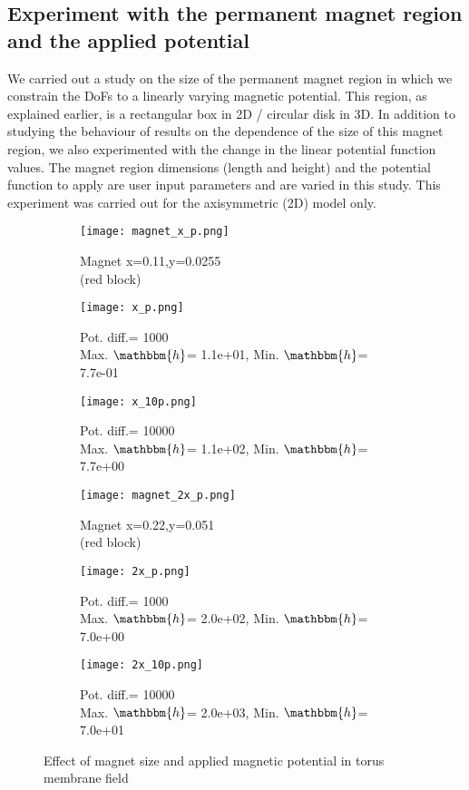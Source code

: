 \subsection{Experiment with the permanent magnet region and the applied potential}
We carried out a study on the size of the permanent magnet region in which we constrain the DoFs to a linearly varying magnetic potential. This region, as explained earlier, is a rectangular box in 2D / circular disk in 3D. In addition to studying the behaviour of results on the dependence of the size of this magnet region, we also experimented with the change in the linear potential function values. The magnet region dimensions (length and height) and the potential function to apply are user input parameters and are varied in this study. This experiment was carried out for the axisymmetric (2D) model only.\par 

\begin{figure}[h]
\centering
\begin{subfigure}{0.32\textwidth}
\centering
\texttt{[image: magnet\_x\_p.png]}
\caption{\scriptsize Magnet x=0.11,y=0.0255 \\(red block)}
\label{fig:1.5.1}
\end{subfigure}
\begin{subfigure}{0.33\textwidth}
\centering
\texttt{[image: x\_p.png]}
\caption{\scriptsize Pot. diff.= 1000 \\ Max. $\mathbbm{h}$= 1.1e+01, Min. $\mathbbm{h}$= 7.7e-01}
\label{fig:1.5.2}
\end{subfigure}
\begin{subfigure}{0.33\textwidth}
\centering
\texttt{[image: x\_10p.png]}
\caption{\scriptsize Pot. diff.= 10000 \\ Max. $\mathbbm{h}$= 1.1e+02, Min. $\mathbbm{h}$= 7.7e+00}
\label{fig:1.5.3}
\end{subfigure}
\vspace{0.5cm}
\begin{subfigure}{0.32\textwidth}
\centering
\texttt{[image: magnet\_2x\_p.png]}
\caption{\scriptsize Magnet x=0.22,y=0.051 \\(red block)}
\label{fig:1.5.4}
\end{subfigure}
\begin{subfigure}{0.33\textwidth}
\centering
\texttt{[image: 2x\_p.png]}
\caption{\scriptsize Pot. diff.= 1000 \\ Max. $\mathbbm{h}$= 2.0e+02, Min. $\mathbbm{h}$= 7.0e+00}
\label{fig:1.5.5}
\end{subfigure}
\begin{subfigure}{0.33\textwidth}
\centering
\texttt{[image: 2x\_10p.png]}
\caption{\scriptsize Pot. diff.= 10000 \\ Max. $\mathbbm{h}$= 2.0e+03, Min. $\mathbbm{h}$= 7.0e+01}
\label{fig:1.5.6}
\end{subfigure}
\caption{Effect of magnet size and applied magnetic potential in torus membrane field}
\label{fig:1.5}
\end{figure}

